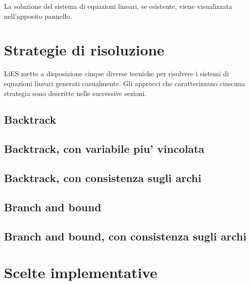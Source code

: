 \documentclass{article}
\begin{document}
La soluzione del sistema di equazioni lineari, se esistente, viene visualizzata nell'apposito pannello.


\section{Strategie di risoluzione}
\label{sec:strategie}

LiES mette a disposizione cinque diverse tecniche per risolvere i sistemi di equazioni lineari generati casualmente. Gli approcci che caratterizzano ciascuna strategia sono descritte nelle successive sezioni.

\subsection{Backtrack}
\label{sec:backtrack}

\subsection{Backtrack, con variabile piu' vincolata}
\label{sec:backtrack_mc}

\subsection{Backtrack, con consistenza sugli archi}
\label{sec:backtrack_ac}

\subsection{Branch and bound}
\label{sec:branch_and_bound}

\subsection{Branch and bound, con consistenza sugli archi}
\label{sec:branch_and_bound_ac}


\section{Scelte implementative}
\label{sec:scelte_implementative}
\end{document}
